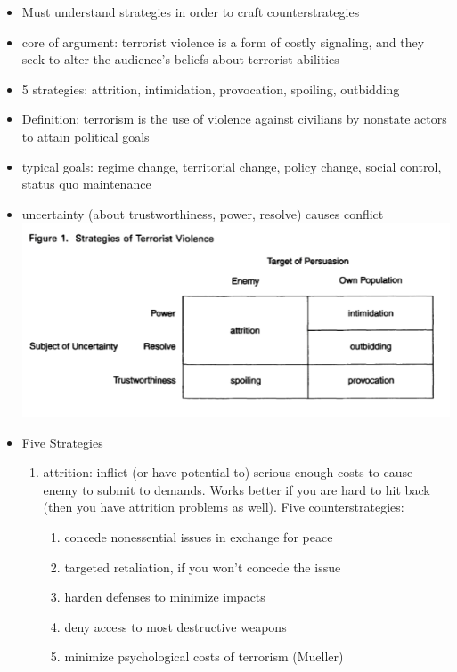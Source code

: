 \documentclass{article}
\begin{document}
\begin{itemize}
    \item Must understand strategies in order to craft counterstrategies
    \item core of argument: terrorist violence is a form of costly signaling, and they seek to alter the audience's beliefs about terrorist abilities
    \item 5 strategies: attrition, intimidation, provocation, spoiling, outbidding
    \item Definition: terrorism is the use of violence against civilians by nonstate actors to attain political goals
    \item typical goals: regime change, territorial change, policy change, social control, status quo maintenance
    \item uncertainty (about trustworthiness, power, resolve) causes conflict\\
    \includegraphics[width=\textwidth]{terroriststrats.png}
    \item Five Strategies
    \begin{enumerate}
        \item attrition: inflict (or have potential to) serious enough costs to cause enemy to submit to demands. Works better if you are hard to hit back (then you have attrition problems as well). Five counterstrategies:
        \begin{enumerate}
            \item concede nonessential issues in exchange for peace
            \item targeted retaliation, if you won't concede the issue
            \item harden defenses to minimize impacts
            \item deny access to most destructive weapons
            \item minimize psychological costs of terrorism (Mueller)
        \end{enumerate}

\end{enumerate}
\end{itemize}
\end{document}
